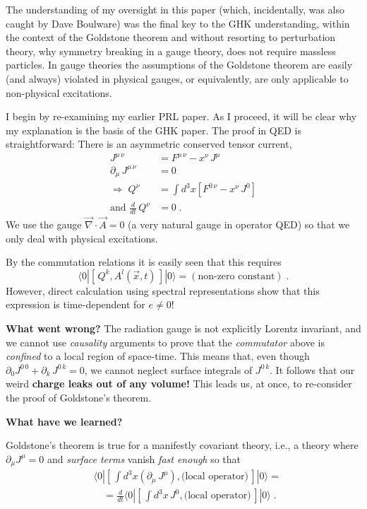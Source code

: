 \documentclass[preprintnumbers,12pt]{revtex4-2}
\newcommand{\pa}{\partial}
\newcommand{\comm}[2]{\left[\,#1,#2\,\right]}
\newcommand{\ipop}[3]{\ensuremath{\langle#1 | #2 | #3\rangle}\xspace}
\begin{document}
The understanding of my oversight in this paper (which, incidentally,
was also caught by Dave Boulware) was the final key to the GHK
understanding, within the context of the Goldstone theorem and without
resorting to perturbation theory, why symmetry breaking in a gauge
theory, does not require massless particles. In gauge theories the
assumptions of the Goldstone theorem are easily (and always) violated in physical
gauges, or equivalently, are only applicable to non-physical
excitations.

I begin by re-examining my earlier PRL paper. As I proceed, it will be
clear why my explanation is the basis of the GHK paper. The proof in
QED is straightforward: There is an asymmetric conserved tensor
current,
\begin{align*}
  J^{\mu\, \nu} &= F^{\mu\, \nu} - x^{\nu}\, J^{\mu} \\
  \pa_{\mu}\, J^{\mu\, \nu} &= 0 \\
  \Rightarrow\; Q^{\nu} &= \int d^3x \left[ F^{0\, \nu} - x^{\nu}\, J^0 \right] \\
  \text{and } \frac{d}{dt}\, Q^{\nu} &= 0 \; .
\end{align*}
We use the gauge $\vec\nabla\cdot\vec{A} = 0$ (a very natural gauge
in operator QED) so that we only deal with physical excitations.

By the commutation relations it is easily seen that this requires
\begin{equation*}
  \ipop{0}{\comm{Q^{k}}{A^{l}(\vec{x}, t)}}{0} = (\text{non-zero constant}) \; .
\end{equation*}
However, direct calculation using spectral representations show that
this expression is time-dependent for $e \neq 0$!


\textbf{What went wrong?} The radiation gauge is not explicitly
Lorentz invariant, and we cannot use \emph{causality} arguments to
prove that the \emph{commutator} above is \emph{confined} to a local
region of space-time. This means that, even though $\pa_{0} J^{0\, 0} + \pa_{k} \, J^{0\, k}
= 0$, we cannot  neglect surface integrals of $J^{0\, k}$. It follows
that our weird  \textbf{charge  leaks out of any volume!} This leads us, at
once, to re-consider the proof of Goldstone's theorem.


\textbf{What have we learned?}

Goldstone's theorem is true for a manifestly covariant theory,
i.e., a theory where $\pa_{\mu} J^{\mu} = 0$ and \emph{surface terms}
vanish \emph{fast enough} so that
\begin{equation*}
  \begin{split}
    & \ipop{0}{\comm{\int d^3x (\pa_{\mu}\, J^{\mu})}{\text{(local operator)}}}{0} = \\
    &\quad = \frac{d}{dt}\ipop{0}{\comm{\int d^3x\, J^0}{\text{(local operator)}}}{0} \; .
  \end{split}
\end{equation*}
\end{document}
